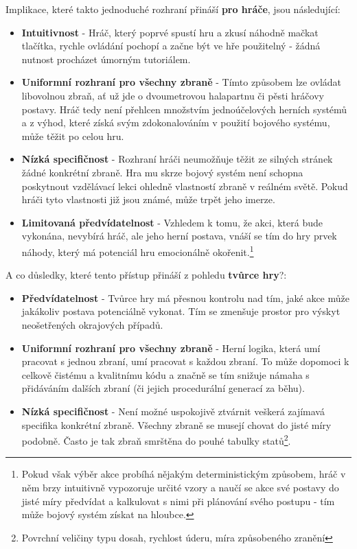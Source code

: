 Implikace, které takto jednoduché rozhraní přináší \textbf{pro hráče}, jsou následující:
\begin{itemize}
    \item \textbf{Intuitivnost} - Hráč, který poprvé spustí hru a zkusí náhodně mačkat tlačítka, rychle ovládání pochopí a začne být ve hře použitelný - žádná nutnost procházet úmorným tutoriálem.
    \item \textbf{Uniformní rozhraní pro všechny zbraně} - Tímto způsobem lze ovládat libovolnou zbraň, ať už jde o dvoumetrovou halapartnu či pěsti hráčovy postavy. Hráč tedy není přehlcen množstvím jednoúčelových herních systémů a z výhod, které získá svým zdokonalováním v použití bojového systému, může těžit po celou hru.
    \item \textbf{Nízká specifičnost} - Rozhraní hráči neumožňuje těžit ze silných stránek žádné konkrétní zbraně. Hra mu skrze bojový systém není schopna poskytnout vzdělávací lekci ohledně vlastností zbraně v reálném světě. Pokud hráči tyto vlastnosti již jsou známé, může trpět jeho imerze.
    \item \textbf{Limitovaná předvídatelnost} - Vzhledem k tomu, že akci, která bude vykonána, nevybírá hráč, ale jeho herní postava, vnáší se tím do hry prvek náhody, který má potenciál hru emocionálně okořenit.\footnote{Pokud však výběr akce probíhá nějakým deterministickým způsobem, hráč v něm brzy intuitivně vypozoruje určité vzory a naučí se akce své postavy do jisté míry předvídat a kalkulovat s nimi při plánování svého postupu - tím může bojový systém získat na hloubce.}
\end{itemize}

A co důsledky, které tento přístup přináší z pohledu \textbf{tvůrce hry}?:
\begin{itemize}
    \item \textbf{Předvídatelnost} - Tvůrce hry má přesnou kontrolu nad tím, jaké akce může jakákoliv postava potenciálně vykonat. Tím se zmenšuje prostor pro výskyt neošetřených okrajových případů.
    \item \textbf{Uniformní rozhraní pro všechny zbraně} - Herní logika, která umí pracovat s jednou zbraní, umí pracovat s každou zbraní. To může dopomoci k celkově čistému a kvalitnímu kódu a značně se tím snižuje námaha s přidáváním dalších zbraní (či jejich procedurální generací za běhu).
    \item \textbf{Nízká specifičnost} - Není možné uspokojivě ztvárnit veškerá zajímavá specifika konkrétní zbraně. Všechny zbraně se musejí chovat do jisté míry podobně. Často je tak zbraň smrštěna do pouhé tabulky statů\footnote{Povrchní veličiny typu dosah, rychlost úderu, míra způsobeného zranění}.
\end{itemize}

